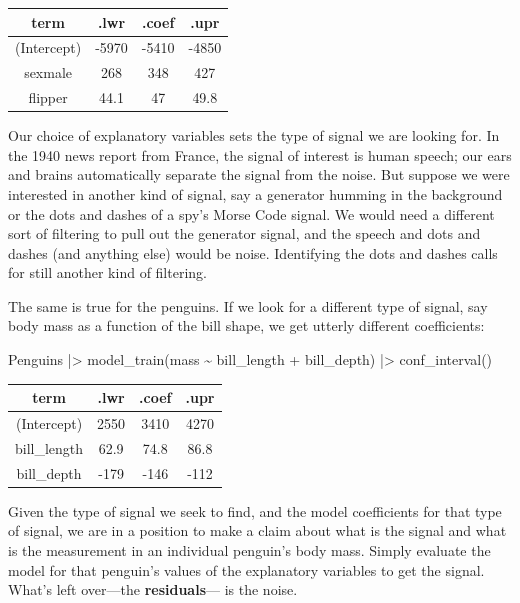\documentclass[
  letterpaper,
  DIV=11,
  numbers=noendperiod,
  oneside]{scrartcl}
\newenvironment{Shaded}{\begin{snugshade}}{\end{snugshade}}
\newcommand{\FunctionTok}[1]{\textcolor[rgb]{0.28,0.35,0.67}{#1}}
\newcommand{\NormalTok}[1]{\textcolor[rgb]{0.00,0.23,0.31}{#1}}
\newcommand{\SpecialCharTok}[1]{\textcolor[rgb]{0.37,0.37,0.37}{#1}}
\begin{document}
\begin{longtable}[]{@{}cccc@{}}
\toprule\noalign{}
term & .lwr & .coef & .upr \\
\midrule\noalign{}
\endhead
\bottomrule\noalign{}
\endlastfoot
(Intercept) & -5970 & -5410 & -4850 \\
sexmale & 268 & 348 & 427 \\
flipper & 44.1 & 47 & 49.8 \\
\end{longtable}

Our choice of explanatory variables sets the type of signal we are
looking for. In the 1940 news report from France, the signal of interest
is human speech; our ears and brains automatically separate the signal
from the noise. But suppose we were interested in another kind of
signal, say a generator humming in the background or the dots and dashes
of a spy's Morse Code signal. We would need a different sort of
filtering to pull out the generator signal, and the speech and dots and
dashes (and anything else) would be noise. Identifying the dots and
dashes calls for still another kind of filtering.

The same is true for the penguins. If we look for a different type of
signal, say body mass as a function of the bill shape, we get utterly
different coefficients:

\begin{Shaded}
\begin{Highlighting}[]
\NormalTok{Penguins }\SpecialCharTok{|\textgreater{}} 
  \FunctionTok{model\_train}\NormalTok{(mass }\SpecialCharTok{\textasciitilde{}}\NormalTok{ bill\_length }\SpecialCharTok{+}\NormalTok{ bill\_depth) }\SpecialCharTok{|\textgreater{}} 
  \FunctionTok{conf\_interval}\NormalTok{()}
\end{Highlighting}
\end{Shaded}

\begin{longtable}[]{@{}cccc@{}}
\toprule\noalign{}
term & .lwr & .coef & .upr \\
\midrule\noalign{}
\endhead
\bottomrule\noalign{}
\endlastfoot
(Intercept) & 2550 & 3410 & 4270 \\
bill\_length & 62.9 & 74.8 & 86.8 \\
bill\_depth & -179 & -146 & -112 \\
\end{longtable}

Given the type of signal we seek to find, and the model coefficients for
that type of signal, we are in a position to make a claim about what is
the signal and what is the measurement in an individual penguin's body
mass. Simply evaluate the model for that penguin's values of the
explanatory variables to get the signal. What's left over---the
\textbf{residuals}--- is the noise.
\end{document}
